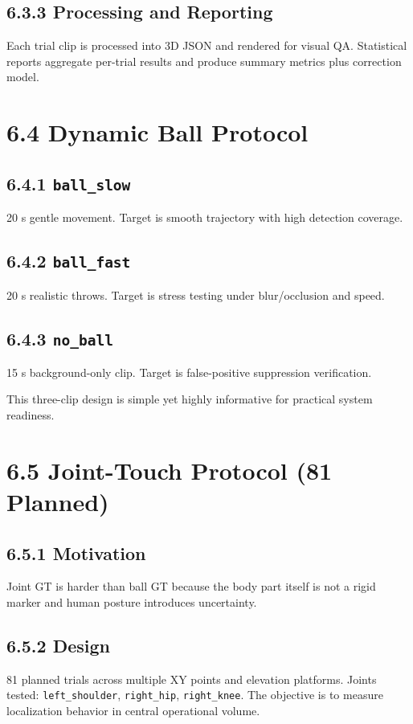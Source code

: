 \subsection{6.3.3 Processing and Reporting}
Each trial clip is processed into 3D JSON and rendered for visual QA. Statistical reports aggregate per-trial results and produce summary metrics plus correction model.

\section{6.4 Dynamic Ball Protocol}
\subsection{6.4.1 \texttt{ball\_slow}}
20 s gentle movement. Target is smooth trajectory with high detection coverage.

\subsection{6.4.2 \texttt{ball\_fast}}
20 s realistic throws. Target is stress testing under blur/occlusion and speed.

\subsection{6.4.3 \texttt{no\_ball}}
15 s background-only clip. Target is false-positive suppression verification.

This three-clip design is simple yet highly informative for practical system readiness.

\section{6.5 Joint-Touch Protocol (81 Planned)}
\subsection{6.5.1 Motivation}
Joint GT is harder than ball GT because the body part itself is not a rigid marker and human posture introduces uncertainty.

\subsection{6.5.2 Design}
81 planned trials across multiple XY points and elevation platforms. Joints tested: \texttt{left\_shoulder}, \texttt{right\_hip}, \texttt{right\_knee}. The objective is to measure localization behavior in central operational volume.

